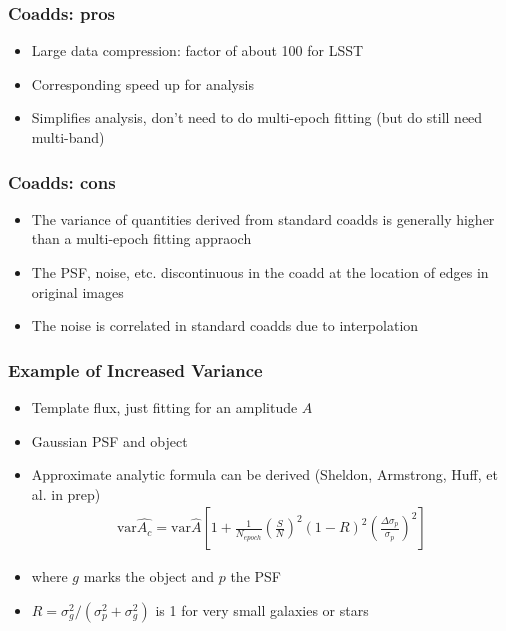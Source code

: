 \documentclass{beamer}
\begin{document}
\frame
{
    \frametitle{Coadds: pros}

    \begin{itemize}

        \item Large data compression:  factor of about 100 for LSST

        \item Corresponding speed up for analysis

        \item Simplifies analysis, don't need to do multi-epoch fitting (but do
            still need multi-band)

    \end{itemize}

}

\frame
{
    \frametitle{Coadds: cons}

    \begin{itemize}

        \item The variance of quantities derived from standard coadds is
            generally higher than a multi-epoch fitting appraoch

        \item The PSF, noise, etc. discontinuous in the coadd at the location
            of edges in original images

        \item The noise is correlated in standard coadds due to interpolation


    \end{itemize}

}

\frame
{
    \frametitle{Example of Increased Variance}
 
 
    \begin{itemize}
        \item Template flux, just fitting for an amplitude $A$
        \item Gaussian PSF and object
        \item Approximate analytic formula can be derived (Sheldon, Armstrong, Huff, et al. in prep)
            {\normalsize
                \begin{align}
                    \textrm{var}{\hat{A_c}} = 
                    \textrm{var}{\hat{A}}\left[ 1 + \frac{1}{N_{epoch}}  \left( \frac{S}{N} \right)^2 (1-R)^2 \left( \frac{\Delta \sigma_p}{\sigma_p} \right)^2 \right]
                \end{align}
             }

         \item where $g$ marks the object and $p$ the PSF
         \item $R = \sigma_g^2/(\sigma_p^2 + \sigma_g^2)$ is 1 for very small galaxies or stars

    \end{itemize}


}
\end{document}
